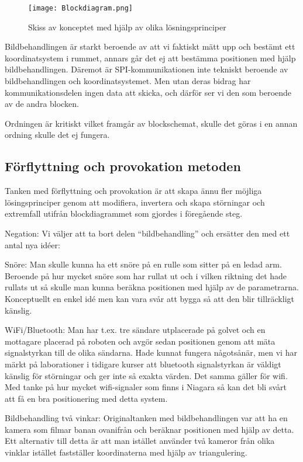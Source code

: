 \documentclass[11pt, a4paper]{report}
\begin{document}
\begin{figure}[H]
	\begin{center}
		\texttt{[image: Blockdiagram.png]}
		\caption{Skiss av konceptet med hjälp av olika lösningsprinciper}
		\label{fig:blockdiagram}
	\end{center}
\end{figure}

Bildbehandlingen är starkt beroende av att vi faktiskt mätt upp och bestämt ett koordinatsystem i rummet, annars går det ej att bestämma positionen med hjälp bildbehandlingen. Däremot är SPI-kommunikationen inte tekniskt beroende av bildbehandlingen och koordinatsystemet. Men utan deras bidrag har kommunikationsdelen ingen data att skicka, och därför ser vi den som beroende av de andra blocken.

Ordningen är kritiskt vilket framgår av blockschemat, skulle det göras i en annan ordning skulle det ej fungera. 


\subsection{Förflyttning och provokation metoden}

Tanken med förflyttning och provokation är att skapa ännu fler möjliga lösingsprinciper genom att modifiera, invertera och skapa störningar och extremfall utifrån blockdiagrammet som gjordes i föregående steg. 

Negation:
Vi väljer att ta bort delen “bildbehandling” och ersätter den med ett antal nya idéer:

Snöre:
Man skulle kunna ha ett snöre på en rulle som sitter på en ledad arm. Beroende på hur mycket snöre som har rullat ut och i vilken riktning det hade rullats ut så skulle man kunna beräkna positionen med hjälp av de parametrarna.
Konceptuellt en enkel idé men kan vara svår att bygga så att den blir tillräckligt känslig.

WiFi/Bluetooth: 
Man har t.ex. tre sändare utplacerade på golvet och en mottagare placerad på roboten och avgör sedan positionen genom att mäta signalstyrkan till de olika sändarna. 
Hade kunnat fungera någotsånär, men vi har märkt på laborationer i tidigare kurser att bluetooth signalstyrkan är väldigt känslig för störningar och ger inte så exakta värden. Det samma gäller för wifi. Med tanke på hur mycket wifi-signaler som finns i Niagara så kan det bli svårt att få en bra positionering med detta system.

Bildbehandling två vinkar:
Originaltanken med bildbehandlingen var att ha en kamera som filmar banan ovanifrån och beräknar positionen med hjälp av detta. Ett alternativ till detta är att man istället använder två kameror från olika vinklar istället fastställer koordinaterna med hjälp av triangulering.
\end{document}
